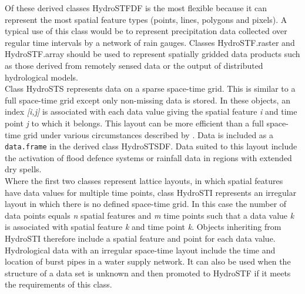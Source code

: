 \documentclass{icldt}\usepackage[]{graphicx}\usepackage[]{color}
\begin{document}
Of these derived classes HydroSTFDF is the most flexible because it can represent the most spatial feature types (points, lines, polygons and pixels). A typical use of this class would be to represent precipitation data collected over regular time intervals by a network of rain gauges. Classes HydroSTF.raster and HydroSTF.array should be used to represent spatially gridded data products such as those derived from remotely sensed data or the output of distributed hydrological models. \\

Class HydroSTS represents data on a sparse space-time grid. This is similar to a full space-time grid except only non-missing data is stored. In these objects, an index \textit{[i,j]} is associated with each data value giving the spatial feature \textit{i} and time point \textit{j} to which it belongs. This layout can be more efficient than a full space-time grid under various circumstances described by \citet{pebesma2012}. Data is included as a \texttt{data.frame} in the derived class HydroSTSDF. Data suited to this layout include the activation of flood defence systems or rainfall data in regions with extended dry spells. \\

Where the first two classes represent lattice layouts, in which spatial features have data values for multiple time points, class HydroSTI represents an irregular layout in which there is no defined space-time grid. In this case the number of data points equals \textit{n} spatial features and \textit{m} time points such that a data value \textit{k} is associated with spatial feature \textit{k} and time point \textit{k}. Objects inheriting from HydroSTI therefore include a spatial feature and point for each data value. Hydrological data with an irregular space-time layout include the time and location of burst pipes in a water supply network. It can also be used when the structure of a data set is unknown and then promoted to HydroSTF if it meets the requirements of this class. \\
\end{document}
